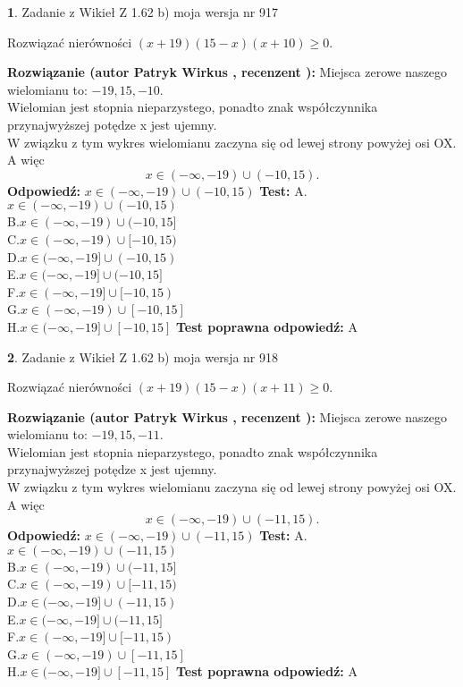\documentclass[12pt, a4paper]{article}
\theoremstyle{definition} %
\newtheorem{zad}{}
\newcommand{\zadStart}[1]{\begin{zad}#1\newline}
\newcommand{\zadStop}{\end{zad}}
\newcommand{\rozwStart}[2]{\noindent \textbf{Rozwiązanie (autor #1 , recenzent #2): }\newline}
\newcommand{\rozwStop}{\newline}
\newcommand{\odpStart}{\noindent \textbf{Odpowiedź:}\newline}
\newcommand{\odpStop}{\newline}
\newcommand{\testStart}{\noindent \textbf{Test:}\newline}
\newcommand{\testStop}{\newline}
\newcommand{\kluczStart}{\noindent \textbf{Test poprawna odpowiedź:}\newline}
\newcommand{\kluczStop}{\newline}
\begin{document}
\zadStart{Zadanie z Wikieł Z 1.62 b) moja wersja nr 917}

Rozwiązać nierówności $(x+19)(15-x)(x+10)\ge0$.
\zadStop
\rozwStart{Patryk Wirkus}{}
Miejsca zerowe naszego wielomianu to: $-19, 15, -10$.\\
Wielomian jest stopnia nieparzystego, ponadto znak współczynnika przy\linebreak najwyższej potędze x jest ujemny.\\ W związku z tym wykres wielomianu zaczyna się od lewej strony powyżej osi OX. A więc $$x \in (-\infty,-19) \cup (-10,15).$$
\rozwStop
\odpStart
$x \in (-\infty,-19) \cup (-10,15)$
\odpStop
\testStart
A.$x \in (-\infty,-19) \cup (-10,15)$\\
B.$x \in (-\infty,-19) \cup (-10,15]$\\
C.$x \in (-\infty,-19) \cup [-10,15)$\\
D.$x \in (-\infty,-19] \cup (-10,15)$\\
E.$x \in (-\infty,-19] \cup (-10,15]$\\
F.$x \in (-\infty,-19] \cup [-10,15)$\\
G.$x \in (-\infty,-19) \cup [-10,15]$\\
H.$x \in (-\infty,-19] \cup [-10,15]$
\testStop
\kluczStart
A
\kluczStop



\zadStart{Zadanie z Wikieł Z 1.62 b) moja wersja nr 918}

Rozwiązać nierówności $(x+19)(15-x)(x+11)\ge0$.
\zadStop
\rozwStart{Patryk Wirkus}{}
Miejsca zerowe naszego wielomianu to: $-19, 15, -11$.\\
Wielomian jest stopnia nieparzystego, ponadto znak współczynnika przy\linebreak najwyższej potędze x jest ujemny.\\ W związku z tym wykres wielomianu zaczyna się od lewej strony powyżej osi OX. A więc $$x \in (-\infty,-19) \cup (-11,15).$$
\rozwStop
\odpStart
$x \in (-\infty,-19) \cup (-11,15)$
\odpStop
\testStart
A.$x \in (-\infty,-19) \cup (-11,15)$\\
B.$x \in (-\infty,-19) \cup (-11,15]$\\
C.$x \in (-\infty,-19) \cup [-11,15)$\\
D.$x \in (-\infty,-19] \cup (-11,15)$\\
E.$x \in (-\infty,-19] \cup (-11,15]$\\
F.$x \in (-\infty,-19] \cup [-11,15)$\\
G.$x \in (-\infty,-19) \cup [-11,15]$\\
H.$x \in (-\infty,-19] \cup [-11,15]$
\testStop
\kluczStart
A
\kluczStop
\end{document}
